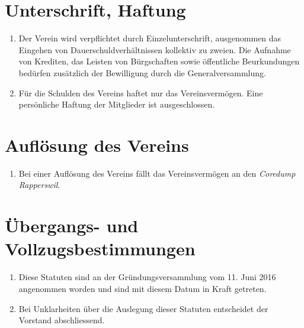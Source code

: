\documentclass[10pt,a4paper,parskip,fleqn]{scrartcl}
\newcommand{\ol}{\begin{enumerate}[itemsep=-0.2em,topsep=-0.2em]}
\newcommand{\lo}{\end{enumerate}}
\newcommand{\li}{\item}
\newcommand{\parent}{Coredump Rapperswil\xspace}
\newcommand{\iparent}{\textit{\parent}\xspace}
\begin{document}
\section{Unterschrift, Haftung}

\ol
	\li Der Verein wird verpflichtet durch Einzelunterschrift, ausgenommen das
	Eingehen von Dauerschuldverhältnissen kollektiv zu zweien. Die Aufnahme von
	Krediten, das Leisten von Bürgschaften sowie öffentliche Beurkundungen
	bedürfen zusätzlich der Bewilligung durch die Generalversammlung.
	\li Für die Schulden des Vereins haftet nur das Vereinsvermögen. Eine
	persönliche Haftung der Mitglieder ist ausgeschlossen.
\lo


\section{Auflösung des Vereins}

\ol
	\li Bei einer Auflösung des Vereins fällt das Vereinsvermögen an den \iparent.
\lo


\section{Übergangs- und Vollzugsbestimmungen}

\ol
	\li Diese Statuten sind an der Gründungsversammlung vom 11. Juni 2016
	angenommen worden und sind mit diesem Datum in Kraft getreten.
	\li Bei Unklarheiten über die Auslegung dieser Statuten entscheidet der
	Vorstand abschliessend.
\lo
\end{document}
